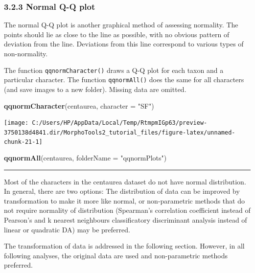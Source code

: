 \documentclass[
]{article}
\newenvironment{Shaded}{\begin{snugshade}}{\end{snugshade}}
\newcommand{\DataTypeTok}[1]{\textcolor[rgb]{0.13,0.29,0.53}{#1}}
\newcommand{\KeywordTok}[1]{\textcolor[rgb]{0.13,0.29,0.53}{\textbf{#1}}}
\newcommand{\NormalTok}[1]{#1}
\newcommand{\StringTok}[1]{\textcolor[rgb]{0.31,0.60,0.02}{#1}}
\begin{document}
\hypertarget{normal-q-q-plot}{%
\subsubsection{3.2.3 Normal Q-Q plot}\label{normal-q-q-plot}}

The normal Q-Q plot is another graphical method of assessing normality.
The points should lie as close to the line as possible, with no obvious
pattern of deviation from the line. Deviations from this line correspond
to various types of non-normality.

The function \texttt{qqnormCharacter()} draws a Q-Q plot for each taxon
and a particular character. The function \texttt{qqnormAll()} does the
same for all characters (and save images to a new folder). Missing data
are omitted.

\begin{Shaded}
\begin{Highlighting}[]
\KeywordTok{qqnormCharacter}\NormalTok{(centaurea, }\DataTypeTok{character =} \StringTok{"SF"}\NormalTok{)}
\end{Highlighting}
\end{Shaded}

\begin{center}\texttt{[image: C:/Users/HP/AppData/Local/Temp/RtmpmIGp63/preview-3750138d4841.dir/MorphoTools2\_tutorial\_files/figure-latex/unnamed-chunk-21-1]} \end{center}

\begin{Shaded}
\begin{Highlighting}[]
\KeywordTok{qqnormAll}\NormalTok{(centaurea, }\DataTypeTok{folderName =} \StringTok{"qqnormPlots"}\NormalTok{)}
\end{Highlighting}
\end{Shaded}

\begin{center}\rule{0.5\linewidth}{\linethickness}\end{center}

Most of the characters in the centaurea dataset do not have normal
distribution. In general, there are two options: The distribution of
data can be improved by transformation to make it more like normal, or
non-parametric methods that do not require normality of distribution
(Spearman's correlation coefficient instead of Pearson's and k nearest
neighbours classificatory discriminant analysis instead of linear or
quadratic DA) may be preferred.

The transformation of data is addressed in the following section.
However, in all following analyses, the original data are used and
non-parametric methods preferred.
\end{document}

